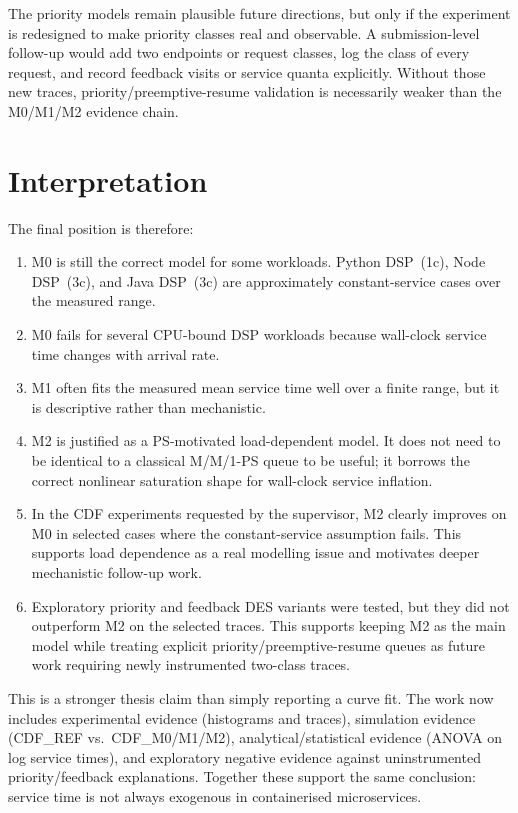 The priority models remain plausible future directions, but only if the experiment is redesigned to make priority classes real and observable. A submission-level follow-up would add two endpoints or request classes, log the class of every request, and record feedback visits or service quanta explicitly. Without those new traces, priority/preemptive-resume validation is necessarily weaker than the M0/M1/M2 evidence chain.

\section{Interpretation}
\label{sec:ld-interpretation}

The final position is therefore:

\begin{enumerate}
    \item M0 is still the correct model for some workloads. Python DSP~(1c), Node DSP~(3c), and Java DSP~(3c) are approximately constant-service cases over the measured range.
    \item M0 fails for several CPU-bound DSP workloads because wall-clock service time changes with arrival rate.
    \item M1 often fits the measured mean service time well over a finite range, but it is descriptive rather than mechanistic.
    \item M2 is justified as a PS-motivated load-dependent model. It does not need to be identical to a classical M/M/1-PS queue to be useful; it borrows the correct nonlinear saturation shape for wall-clock service inflation.
    \item In the CDF experiments requested by the supervisor, M2 clearly improves on M0 in selected cases where the constant-service assumption fails. This supports load dependence as a real modelling issue and motivates deeper mechanistic follow-up work.
    \item Exploratory priority and feedback DES variants were tested, but they did not outperform M2 on the selected traces. This supports keeping M2 as the main model while treating explicit priority/preemptive-resume queues as future work requiring newly instrumented two-class traces.
\end{enumerate}

This is a stronger thesis claim than simply reporting a curve fit. The work now includes experimental evidence (histograms and traces), simulation evidence (CDF\_REF vs.\ CDF\_M0/M1/M2), analytical/statistical evidence (ANOVA on log service times), and exploratory negative evidence against uninstrumented priority/feedback explanations. Together these support the same conclusion: service time is not always exogenous in containerised microservices.


